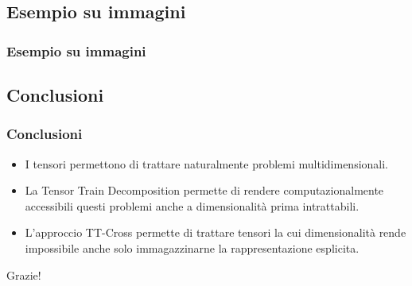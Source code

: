 \documentclass[compress]{beamer}
\theoremstyle{definition}
\theoremstyle{plain}
\begin{document}
\subsection{Esempio su immagini}
\begin{frame}
\frametitle{Esempio su immagini}
\begin{center}
\end{center}
\end{frame}

\subsection{Conclusioni}
\begin{frame}
\frametitle{Conclusioni}
\begin{itemize}
	\item I tensori permettono di trattare naturalmente problemi multidimensionali.
	\item La Tensor Train Decomposition permette di rendere computazionalmente accessibili questi problemi anche a dimensionalità prima intrattabili.
	\item L'approccio TT-Cross permette di trattare tensori la cui dimensionalità rende impossibile anche solo immagazzinarne la rappresentazione esplicita.
\end{itemize}

\pause
\vspace{2mm}
\begin{center}
	\Huge Grazie!
\end{center}
\end{frame}

\end{document}
